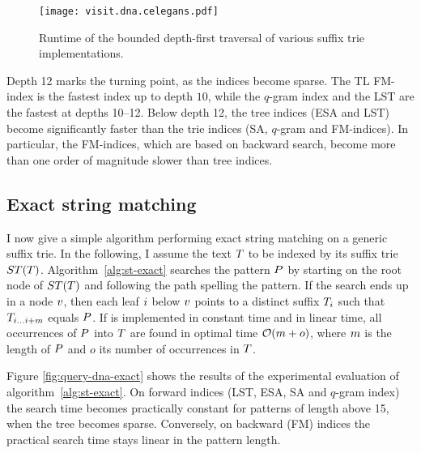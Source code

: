 \begin{figure}[t]
\begin{center}
\caption[Depth-first traversal runtime]{Runtime of the bounded depth-first traversal of various suffix trie implementations.}
\label{fig:visit-dna}
\texttt{[image: visit.dna.celegans.pdf]}
\end{center}
\end{figure}

\newpage

Depth 12 marks the turning point, as the indices become sparse.
The TL FM-index is the fastest index up to depth $10$, while the $q$-gram index and the LST are the fastest at depths 10--12.
Below depth 12, the tree indices (ESA and LST) become significantly faster than the trie indices (SA, $q$-gram and FM-indices).
In particular, the FM-indices, which are based on backward search, become more than one order of magnitude slower than tree indices.

\subsection{Exact string matching}
\label{sec:index:algo:exact}

I now give a simple algorithm performing exact string matching on a generic suffix trie.
In the following, I assume the text $T$ to be indexed by its suffix trie $ST(T)$.
Algorithm~\ref{alg:st-exact} searches the pattern $P$ by starting on the root node of $ST(T)$ and following the path spelling the pattern.
If the search ends up in a node $v$, then each leaf $i$ below $v$ points to a distinct suffix ${T}_{i}$ such that ${T}_{{i}\dots{i+m}}$ equals $P$.
If  is implemented in constant time and  in linear time, all occurrences of $P$ into $T$ are found in optimal time $\mathcal{O}(m+o)$, where $m$ is the length of $P$ and $o$ its number of occurrences in $T$.

Figure \ref{fig:query-dna-exact} shows the results of the experimental evaluation of algorithm~\ref{alg:st-exact}.
On forward indices (LST, ESA, SA and $q$-gram index) the search time becomes practically constant for patterns of length above 15, \ie when the tree becomes sparse.
Conversely, on backward (FM) indices the practical search time stays linear in the pattern length. 

